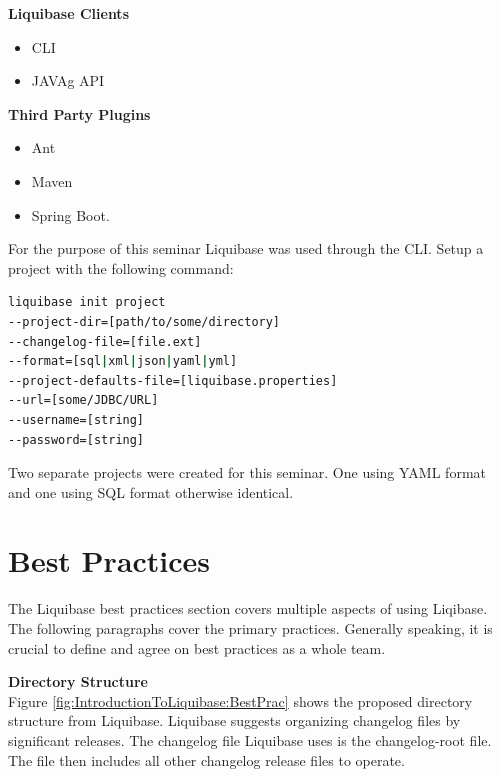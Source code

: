 \begin{minipage}[t]{0.5\textwidth}
	\textbf{Liquibase Clients}	
	\begin{itemize}
		\item \Gls{CLI}
		\item \gls{JAVAg} \acrshort{API}
	\end{itemize}
\end{minipage}
\begin{minipage}[t]{0.5\textwidth}
	\textbf{Third Party Plugins}
	\begin{itemize}
		\item Ant
		\item Maven
		\item Spring Boot.
	\end{itemize}
\end{minipage}
\vspace{0.3cm}

%
For the purpose of this seminar Liquibase was used through the \gls{CLI}. Setup a project with the following command: 

\begin{lstlisting}[language=bash]
liquibase init project
--project-dir=[path/to/some/directory]
--changelog-file=[file.ext]
--format=[sql|xml|json|yaml|yml]
--project-defaults-file=[liquibase.properties]
--url=[some/JDBC/URL]
--username=[string]
--password=[string]
\end{lstlisting}

Two separate projects were created for this seminar. One using YAML format and one using \gls{SQL} format otherwise identical.

\section{Best Practices}
%
The Liquibase best practices section covers multiple aspects of using Liqibase. The following paragraphs cover the primary practices. Generally speaking, it is crucial to define and agree on best practices as a whole team.

\textbf{Directory Structure}\\
%
Figure \ref{fig:IntroductionToLiquibase:BestPrac} shows the proposed directory structure from Liquibase. Liquibase suggests organizing changelog files by significant releases. The changelog file Liquibase uses is the changelog-root file. The file then includes all other changelog release files to operate.

